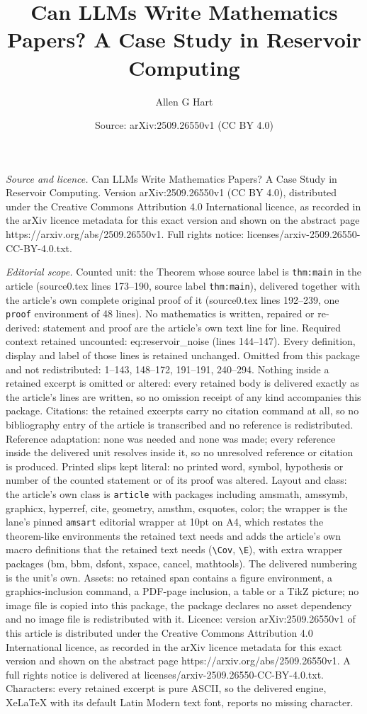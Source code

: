 \documentclass[10pt,a4paper]{amsart}
\title[Can LLMs Write Mathematics Papers? A Case Study in Reservoir]{Can LLMs Write Mathematics Papers? A Case Study in Reservoir Computing}
\author{Allen G Hart}
\date{Source: arXiv:2509.26550v1 (CC BY 4.0)}
\begin{document}
\maketitle

\noindent\emph{Source and licence.} Can LLMs Write Mathematics Papers? A Case Study in Reservoir Computing. Version arXiv:2509.26550v1 (CC BY 4.0), distributed under the Creative Commons Attribution 4.0 International licence, as recorded in the arXiv licence metadata for this exact version and shown on the abstract page https://arxiv.org/abs/2509.26550v1. Full rights notice: licenses/arxiv-2509.26550-CC-BY-4.0.txt.\par\smallskip

\noindent\textit{Editorial scope.} Counted unit: the Theorem whose source label is \texttt{thm:main} in the article (source0.tex lines 173--190, source label \texttt{thm:main}), delivered together with the article's own complete original proof of it (source0.tex lines 192--239, one \texttt{proof} environment of 48 lines). No mathematics is written, repaired or re-derived: statement and proof are the article's own text line for line. Required context retained uncounted: eq:reservoir\_noise (lines 144--147). Every definition, display and label of those lines is retained unchanged. Omitted from this package and not redistributed: 1--143, 148--172, 191--191, 240--294. Nothing inside a retained excerpt is omitted or altered: every retained body is delivered exactly as the article's lines are written, so no omission receipt of any kind accompanies this package. Citations: the retained excerpts carry no citation command at all, so no bibliography entry of the article is transcribed and no reference is redistributed. Reference adaptation: none was needed and none was made; every reference inside the delivered unit resolves inside it, so no unresolved reference or citation is produced. Printed slips kept literal: no printed word, symbol, hypothesis or number of the counted statement or of its proof was altered. Layout and class: the article's own class is \texttt{article} with packages including amsmath, amssymb, graphicx, hyperref, cite, geometry, amsthm, csquotes, color; the wrapper is the lane's pinned \texttt{amsart} editorial wrapper at 10pt on A4, which restates the theorem-like environments the retained text needs and adds the article's own macro definitions that the retained text needs (\texttt{\textbackslash Cov}, \texttt{\textbackslash E}), with extra wrapper packages (bm, bbm, dsfont, xspace, cancel, mathtools). The delivered numbering is the unit's own. Assets: no retained span contains a figure environment, a graphics-inclusion command, a PDF-page inclusion, a table or a TikZ picture; no image file is copied into this package, the package declares no asset dependency and no image file is redistributed with it. Licence: version arXiv:2509.26550v1 of this article is distributed under the Creative Commons Attribution 4.0 International licence, as recorded in the arXiv licence metadata for this exact version and shown on the abstract page https://arxiv.org/abs/2509.26550v1. A full rights notice is delivered at licenses/arxiv-2509.26550-CC-BY-4.0.txt. Characters: every retained excerpt is pure ASCII, so the delivered engine, XeLaTeX with its default Latin Modern text font, reports no missing character.
\end{document}

